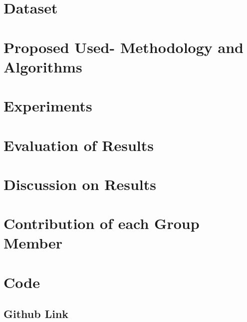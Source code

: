 \documentclass{article}
\begin{document}
\section{Dataset}


\section{Proposed Used- Methodology and Algorithms}


\section{Experiments}


\section{Evaluation of Results}


\section{Discussion on Results}


\section{Contribution of each Group Member}


\section{Code}
\subsection{Github Link}
\end{document}
